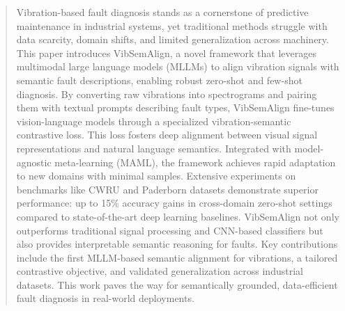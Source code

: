 \begin{abstract}
Vibration-based fault diagnosis stands as a cornerstone of predictive maintenance in industrial systems, yet traditional methods struggle with data scarcity, domain shifts, and limited generalization across machinery. This paper introduces VibSemAlign, a novel framework that leverages multimodal large language models (MLLMs) to align vibration signals with semantic fault descriptions, enabling robust zero-shot and few-shot diagnosis. By converting raw vibrations into spectrograms and pairing them with textual prompts describing fault types, VibSemAlign fine-tunes vision-language models through a specialized vibration-semantic contrastive loss. This loss fosters deep alignment between visual signal representations and natural language semantics. Integrated with model-agnostic meta-learning (MAML), the framework achieves rapid adaptation to new domains with minimal samples. Extensive experiments on benchmarks like CWRU and Paderborn datasets demonstrate superior performance: up to 15\% accuracy gains in cross-domain zero-shot settings compared to state-of-the-art deep learning baselines. VibSemAlign not only outperforms traditional signal processing and CNN-based classifiers but also provides interpretable semantic reasoning for faults. Key contributions include the first MLLM-based semantic alignment for vibrations, a tailored contrastive objective, and validated generalization across industrial datasets. This work paves the way for semantically grounded, data-efficient fault diagnosis in real-world deployments.
\end{abstract}
